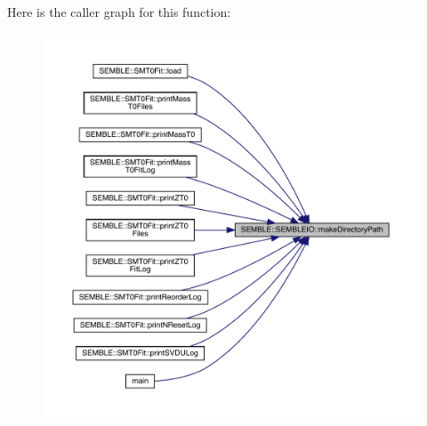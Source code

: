 Here is the caller graph for this function\+:
\nopagebreak
\begin{figure}[H]
\begin{center}
\leavevmode
\includegraphics[width=350pt]{d7/d84/namespaceSEMBLE_1_1SEMBLEIO_a522b094bf70472aca4f1875006d8568d_icgraph}
\end{center}
\end{figure}
